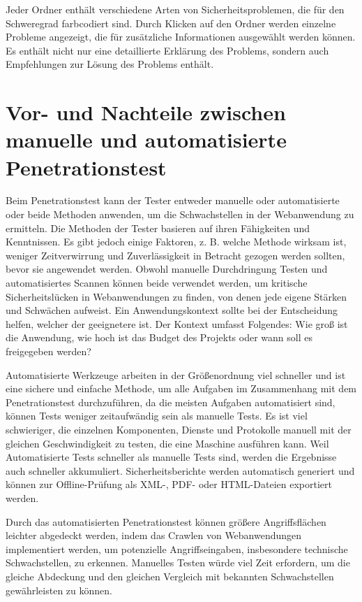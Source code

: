 Jeder Ordner enthält verschiedene Arten von Sicherheitsproblemen, die für den Schweregrad farbcodiert sind. Durch Klicken auf den Ordner werden einzelne Probleme angezeigt, die für zusätzliche Informationen ausgewählt werden können. Es enthält nicht nur eine detaillierte Erklärung des Problems, sondern auch Empfehlungen zur Lösung des Problems enthält.

\section{Vor- und Nachteile zwischen manuelle und automatisierte Penetrationstest}

Beim Penetrationstest kann der Tester entweder manuelle oder automatisierte oder beide Methoden anwenden, um die Schwachstellen in der Webanwendung zu ermitteln. Die Methoden der Tester basieren auf ihren Fähigkeiten und Kenntnissen. Es gibt jedoch einige Faktoren, z. B. welche Methode wirksam ist, weniger Zeitverwirrung und Zuverlässigkeit in Betracht gezogen werden sollten, bevor sie angewendet werden. Obwohl manuelle Durchdringung Testen und automatisiertes Scannen können beide verwendet werden, um kritische Sicherheitslücken in Webanwendungen zu finden, von denen jede eigene Stärken und Schwächen aufweist. Ein Anwendungskontext sollte bei der Entscheidung helfen, welcher der geeignetere ist. Der Kontext umfasst Folgendes: Wie groß ist die Anwendung, wie hoch ist das Budget des Projekts oder wann soll es freigegeben werden? 

Automatisierte Werkzeuge arbeiten in der Größenordnung viel schneller und ist eine sichere und einfache Methode, um alle Aufgaben im Zusammenhang mit dem Penetrationstest durchzuführen, da die meisten Aufgaben automatisiert sind, können Tests weniger zeitaufwändig sein als manuelle Tests. Es ist viel schwieriger, die einzelnen Komponenten, Dienste und Protokolle manuell mit der gleichen Geschwindigkeit zu testen, die eine Maschine ausführen kann. Weil Automatisierte Tests schneller als manuelle Tests sind, werden die Ergebnisse auch schneller akkumuliert. Sicherheitsberichte werden automatisch generiert und können zur Offline-Prüfung als XML-, PDF- oder HTML-Dateien exportiert werden\cite{autovorteil99}.

Durch das automatisierten Penetrationstest können größere Angriffsflächen leichter abgedeckt werden, indem das Crawlen von Webanwendungen implementiert werden, um potenzielle Angriffseingaben, insbesondere technische Schwachstellen, zu erkennen. Manuelles Testen würde viel Zeit erfordern, um die gleiche Abdeckung und den gleichen Vergleich mit bekannten Schwachstellen gewährleisten zu können\cite{packetlabs18}.

